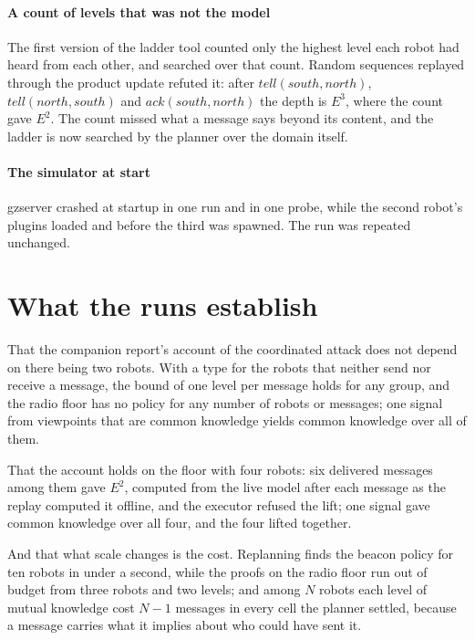 \documentclass[11pt,a4paper]{article}
\theoremstyle{definition}
\newcommand{\ag}[1]{\mathit{#1}}
\begin{document}
\paragraph{A count of levels that was not the model} The first version of the
ladder tool counted only the highest level each robot had heard from each
other, and searched over that count. Random sequences replayed through the
product update refuted it: after $\mathit{tell}(\ag{south},\ag{north})$,
$\mathit{tell}(\ag{north},\ag{south})$ and $\mathit{ack}(\ag{south},\ag{north})$
the depth is $E^3$, where the count gave $E^2$. The count missed what a message
says beyond its content, and the ladder is now searched by the planner over the
domain itself.

\paragraph{The simulator at start} gzserver crashed at startup in one run and in
one probe, while the second robot's plugins loaded and before the third was
spawned. The run was repeated unchanged.

\section{What the runs establish}
\label{sec:established}

That the companion report's account of the coordinated attack does not depend
on there being two robots. With a type for the robots that neither send nor
receive a message, the bound of one level per message holds for any group, and
the radio floor has no policy for any number of robots or messages; one signal
from viewpoints that are common knowledge yields common knowledge over all of
them.

That the account holds on the floor with four robots: six delivered messages
among them gave $E^2$, computed from the live model after each message as the
replay computed it offline, and the executor refused the lift; one signal gave
common knowledge over all four, and the four lifted together.

And that what scale changes is the cost. Replanning finds the beacon policy for
ten robots in under a second, while the proofs on the radio floor run out of
budget from three robots and two levels; and among $N$ robots each level of
mutual knowledge cost $N-1$ messages in every cell the planner settled, because
a message carries what it implies about who could have sent it.
\end{document}
